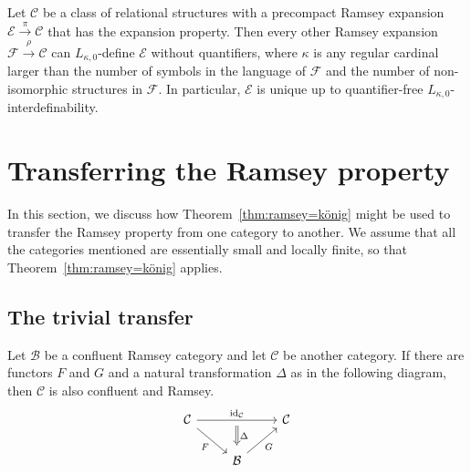 \documentclass[preprint,12pt]{elsarticle}
\newcommand{\cat}[1]{\mathcal{#1}}
\DeclareMathOperator{\id}{id}
\begin{document}
\begin{cor}
    Let $\cat C$ be a class of relational structures with a precompact Ramsey expansion $\cat E\xrightarrow{\pi} \cat C$ that has the expansion property.
    Then every other Ramsey expansion $\cat F\xrightarrow{\rho}\cat C$ can $L_{\kappa,0}$-define $\cat E$ without quantifiers, where $\kappa$ is any regular cardinal larger than the number of symbols in the language of $\cat F$ and the number of non-isomorphic structures in $\cat F$. In particular, $\cat E$ is unique up to quantifier-free $L_{\kappa,0}$-interdefinability.
\end{cor}


\section{Transferring the Ramsey property}
\label{sec:transfers}


In this section, we discuss how Theorem~\ref{thm:ramsey=könig} might be used to transfer the Ramsey property from one category to another.
We assume that all the categories mentioned are essentially small and locally finite, so that Theorem~\ref{thm:ramsey=könig} applies.


\subsection{The trivial transfer}


\begin{prop}
\label{prop:preadjunction}
    Let $\cat B$ be a confluent Ramsey category and let $\cat C$ be another category. If there are functors $F$ and $G$ and a natural transformation $\Delta$ as in the following diagram, then $\cat C$ is also confluent and Ramsey.
    $$
 \begin{tikzcd}
\cat C  \arrow[rr, "\id_{\cat C}", ""name=id] 
        \arrow[rd, "F"'] &   & 
\cat C \\
& \cat B \arrow[ru, "G"']       & \arrow[from=id, to=2-2, "\Delta", Rightarrow, shorten >=1ex, shorten <=1ex]      
\end{tikzcd}
$$
\end{prop}
\end{document}
